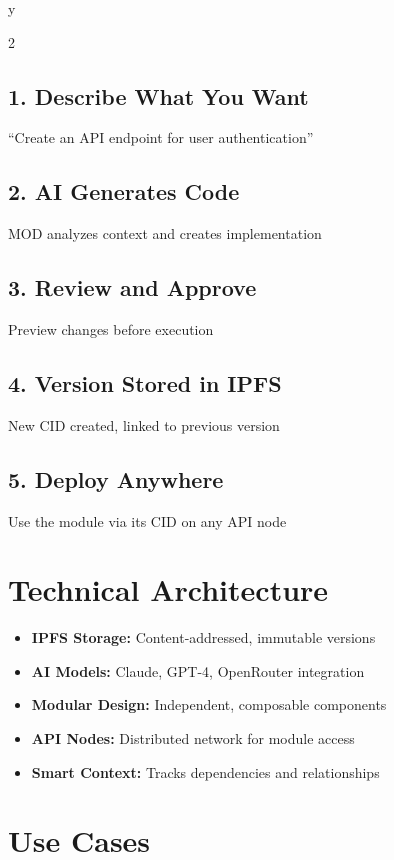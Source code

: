 y\documentclass[11pt,a4paper]{article}
\begin{document}
\begin{multicols}{2}
\subsection*{1. Describe What You Want}
``Create an API endpoint for user authentication''

\subsection*{2. AI Generates Code}
MOD analyzes context and creates implementation

\subsection*{3. Review and Approve}
Preview changes before execution

\subsection*{4. Version Stored in IPFS}
New CID created, linked to previous version

\subsection*{5. Deploy Anywhere}
Use the module via its CID on any API node

\section*{\textcolor{primarycolor}{Technical Architecture}}

\begin{itemize}
    \item \textbf{IPFS Storage:} Content-addressed, immutable versions
    \item \textbf{AI Models:} Claude, GPT-4, OpenRouter integration
    \item \textbf{Modular Design:} Independent, composable components
    \item \textbf{API Nodes:} Distributed network for module access
    \item \textbf{Smart Context:} Tracks dependencies and relationships
\end{itemize}

\section*{\textcolor{primarycolor}{Use Cases}}


\end{multicols}
\end{document}
